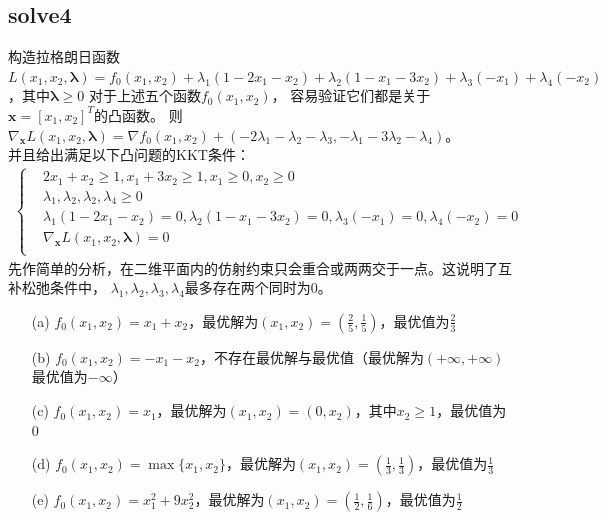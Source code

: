 \documentclass[12pt,a4paper]{ctexart}
\begin{document}
\subsection*{solve4}
构造拉格朗日函数$L(x_1,x_2,\boldsymbol{\lambda})=f_0(x_1,x_2)+\lambda_1(1-2x_1-x_2)
+\lambda_2(1-x_1-3x_2)+\lambda_3(-x_1)+\lambda_4(-x_2)$，其中$\boldsymbol{\lambda} \geq 0$
对于上述五个函数$f_0(x_1,x_2)$，
容易验证它们都是关于$\boldsymbol{x}=[x_1,x_2]^T$的凸函数。
则$\nabla_{\boldsymbol{x}} L(x_1,x_2,\boldsymbol{\lambda})=\nabla f_0(x_1,x_2)+(-2\lambda_1-\lambda_2-\lambda_3,-\lambda_1-3\lambda_2-\lambda_4)$。\\
并且给出满足以下凸问题的KKT条件：
\begin{align*}
\left \{
\begin{array}{ll}
    &2x_1+x_2 \geq 1,x_1+3x_2 \geq 1,x_1 \geq 0,x_2 \geq 0\\
    &\lambda_1,\lambda_2,\lambda_2,\lambda_4 \geq 0\\
    & \lambda_1 (1-2x_1-x_2)=0,\lambda_2(1-x_1-3x_2)=0,\lambda_3(-x_1)=0,\lambda_4(-x_2)=0\\
    & \nabla_{\boldsymbol{x}}L(x_1,x_2,\boldsymbol{\lambda})=0\\
\end{array}
\right.
\end{align*}
先作简单的分析，在二维平面内的仿射约束只会重合或两两交于一点。这说明了互补松弛条件中，
$\lambda_1,\lambda_2,\lambda_3,\lambda_4$最多存在两个同时为0。
\begin{itemize}
    \item[(a)] $f_0(x_1,x_2)=x_1+x_2$，最优解为$(x_1,x_2)=(\frac{2}{5},\frac{1}{5})$，最优值为$\frac{2}{3}$
    \item[(b)] $f_0(x_1,x_2)=-x_1-x_2$，不存在最优解与最优值（最优解为$(+\infty,+\infty)$最优值为$-\infty$）
    \item[(c)] $f_0(x_1,x_2)=x_1$，最优解为$(x_1,x_2)=(0,x_2)$，其中$x_2 \geq 1$，最优值为$0$
    \item[(d)] $f_0(x_1,x_2)=\max\{x_1,x_2\}$，最优解为$(x_1,x_2)=(\frac{1}{3},\frac{1}{3})$，最优值为$\frac{1}{3}$
    \item[(e)] $f_0(x_1,x_2)=x_1^2+9x_2^2$，最优解为$(x_1,x_2)=(\frac{1}{2},\frac{1}{6})$，最优值为$\frac{1}{2}$
\end{itemize}  
\end{document}
